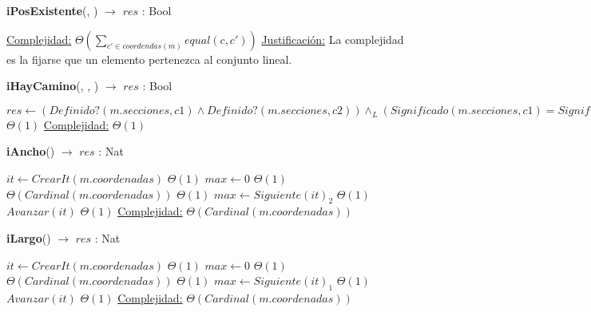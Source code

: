\begin{Algoritmos}
\begin{algorithm}[H]{\textbf{iPosExistente}(, ) $\to$ $res$ : Bool}
\begin{algorithmic}[1]
			\medskip
			\Statex \underline{Complejidad:} $\Theta\left(\displaystyle\sum_{c' \in coordendas(m)}equal(c,c')\right)$
			\Statex \underline{Justificación:} La complejidad es la fijarse que un elemento pertenezca al conjunto lineal.
    	\end{algorithmic}
\end{algorithm}

\begin{algorithm}[H]{\textbf{iHayCamino}(, , ) $\to$ $res$ : Bool}
    	\begin{algorithmic}[1]
			\State $res \gets (Definido?(m.secciones, c1) \land Definido?(m.secciones, c2)) \land_L (Significado(m.secciones, c1) = Significado(m.secciones, c2))$ \Comment $\Theta(1)$
			\medskip
			\Statex \underline{Complejidad:} $\Theta(1)$
    	\end{algorithmic}
\end{algorithm}

\begin{algorithm}[H]{\textbf{iAncho}() $\to$ $res$ : Nat}
    	\begin{algorithmic}[1]
			\State $it \gets CrearIt(m.coordenadas)$ \Comment $\Theta(1)$
			\State $max \gets 0$ \Comment $\Theta(1)$
			 \Comment $\Theta(Cardinal(m.coordenadas))$
				 \Comment $\Theta(1)$
					\State $max \gets Siguiente(it)_{2}$ \Comment $\Theta(1)$	
				\EndIf
				\State $Avanzar(it)$ \Comment $\Theta(1)$				
			\EndWhile
			\medskip
			\Statex \underline{Complejidad:} $\Theta(Cardinal(m.coordenadas))$
    	\end{algorithmic}
\end{algorithm}

\begin{algorithm}[H]{\textbf{iLargo}() $\to$ $res$ : Nat}
    	\begin{algorithmic}[1]
			\State $it \gets CrearIt(m.coordenadas)$ \Comment $\Theta(1)$
			\State $max \gets 0$ \Comment $\Theta(1)$
			 \Comment $\Theta(Cardinal(m.coordenadas))$
				 \Comment $\Theta(1)$
					\State $max \gets Siguiente(it)_{1}$ \Comment $\Theta(1)$					
				\EndIf
				\State $Avanzar(it)$ \Comment $\Theta(1)$				
			\EndWhile
			\medskip
			\Statex \underline{Complejidad:} $\Theta(Cardinal(m.coordenadas))$
    	\end{algorithmic}
\end{algorithm}

\end{Algoritmos}
